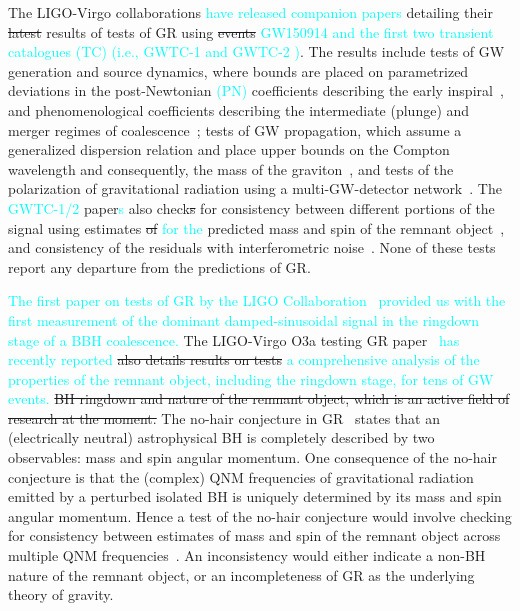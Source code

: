 \documentclass[twocolumn,prd,superscriptaddress,amsfonts,amssymb,amsmath,preprintnumbers]{revtex4-1}
\newcommand{\ab}[1]{\textcolor{cyan}{#1}}
\begin{document}
The LIGO-Virgo collaborations \ab{have released companion papers \cite{}} detailing their \sout{latest} results 
of tests of GR using \sout{events} \ab{GW150914 \cite{} and 
the first two transient catalogues (TC) (i.e., GWTC-1\cite{}  and GWTC-2 \cite{})}. 
The results include tests of GW generation and source dynamics, where bounds are placed on
parametrized deviations in the post-Newtonian \ab{(PN)} coefficients describing
the early inspiral~\citep{earlydevelopmentpapers}, and
phenomenological coefficients describing the intermediate (plunge) and
merger regimes of coalescence~\citep{TIGERmethodspapers}; tests of GW
propagation, which assume a generalized dispersion relation and place
upper bounds on the Compton wavelength and consequently, the mass of
the graviton~\citep{gw170104,samajdar2017projected}, and tests of the
polarization of gravitational radiation using a
multi-GW-detector network~\citep{gw170814,isi2017probing}. The \ab{GWTC-1/2} paper\ab{s} also 
check\sout{s} for consistency between different portions of the signal using estimates
\sout{of} \ab{for the} predicted mass and spin of the remnant
object~\citep{Ghosh:2016xx,Ghosh:2017gfp,LSC_2016grtests}, and
consistency of the residuals with interferometric
noise~\citep{Ghonge:2020suv,gwtc1_tgr}. None of these tests report any
departure from the predictions of GR.

\ab{The first paper on tests of GR by the LIGO Collaboration~\cite{} provided us with the 
first measurement of the dominant damped-sinusoidal signal in the ringdown stage of a BBH 
coalescence.} The LIGO-Virgo O3a testing GR paper~\cite{} \ab{has recently reported} 
\sout{also details results on tests} \ab{a comprehensive analysis of the properties of the 
remnant object, including the ringdown stage, for tens of GW events.}   
\sout{BH ringdown and nature of the remnant object, which is an active field
of research at the moment.} The no-hair conjecture in GR~\citep{}
states that an (electrically neutral) astrophysical BH is completely
described by two observables: mass and spin angular momentum. One
consequence of the no-hair conjecture is that the (complex) QNM
frequencies of gravitational radiation emitted by a perturbed isolated
BH is uniquely determined by its mass and spin angular momentum. Hence
a test of the no-hair conjecture would involve checking for
consistency between estimates of mass and spin of the remnant object
across multiple QNM frequencies~\cite{Dreyer:2003bv}. An inconsistency would either
indicate a non-BH nature of the remnant object, or an incompleteness
of GR as the underlying theory of gravity. 
\end{document}
